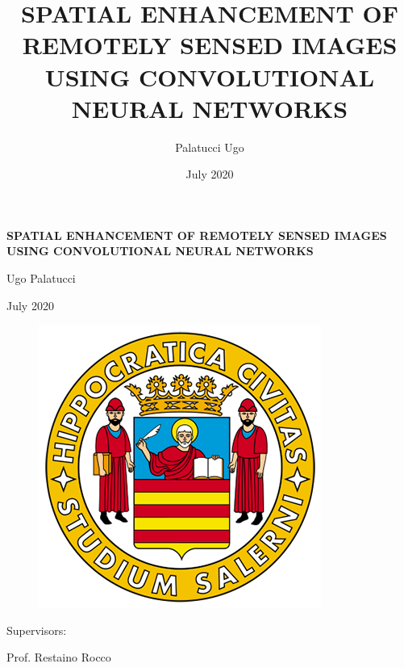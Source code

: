 \documentclass[12pt]{report}
\title{SPATIAL ENHANCEMENT OF REMOTELY SENSED IMAGES USING CONVOLUTIONAL NEURAL NETWORKS}
\author{Palatucci Ugo}
\date{July 2020}
\begin{document}

\begin{titlepage}
    \begin{center}
        \vspace*{1cm}
            
        \large
        \textbf{SPATIAL ENHANCEMENT OF REMOTELY SENSED IMAGES USING CONVOLUTIONAL NEURAL NETWORKS}
            
        \vspace{0.5cm}
            
        Ugo Palatucci
            
        \vspace{0.25cm}

        July 2020
            
        \vspace{0.8cm}
            
        \begin{figure}[!ht]
            \centering
            \includegraphics[scale=.5]{unisa.png}
        \end{figure}
            
    \end{center}
    Supervisors:

    Prof. Restaino Rocco
    
\end{titlepage}

\restoregeometry

\tableofcontents
\end{document}
